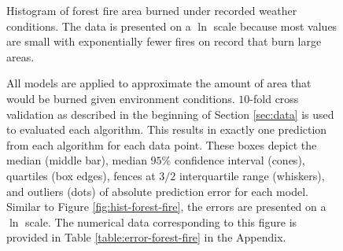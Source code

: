 \documentclass[smallextended,final]{svjour3}  %
\begin{document}
\begin{figure}
  \centering
  \caption{Histogram of forest fire area burned under recorded weather
    conditions. The data is presented on a $\ln$ scale because
    most values are small with exponentially fewer fires on record
    that burn large areas.}
  \label{fig:hist-forest-fire}

  \vspace{.3cm}

  \caption{All models are applied to approximate the amount of area
    that would be burned given environment conditions. $10$-fold cross
    validation as described in the beginning of Section \ref{sec:data}
    is used to evaluated each algorithm. This results in exactly one
    prediction from each algorithm for each data point. These boxes
    depict the median (middle bar), median $95\%$ confidence interval
    (cones), quartiles (box edges), fences at $3/2$ interquartile
    range (whiskers), and outliers (dots) of absolute prediction error
    for each model. Similar to Figure \ref{fig:hist-forest-fire}, the
    errors are presented on a $\ln$ scale. The numerical data
    corresponding to this figure is provided in Table
    \ref{table:error-forest-fire} in the Appendix.}
  \label{fig:error-forest-fire}
\end{figure}
\end{document}
